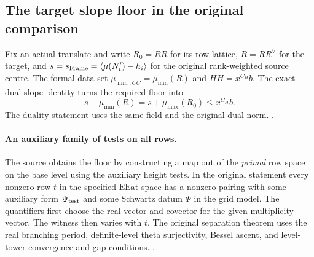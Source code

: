 \subsection{The target slope floor in the original comparison}
\label{geom:actual-target-floor}

Fix an actual translate and write \(R_0=RR\) for its row lattice,
\(R=RR^\vee\) for the target, and
\(s=s_{\rm Frame}=\langle\mu(N'_i)-h_i\rangle\) for the original
rank-weighted source centre. The formal data set
\(\mu_{\min,CC}=\mu_{\min}(R)\) and \(HH=x^{C_H}b\).
The exact dual-slope identity turns the required floor into
\[
 s-\mu_{\min}(R)=s+\mu_{\max}(R_0)\le x^{C_H}b.
\]
The duality statement uses the same field and the original dual norm.
.

\paragraph{An auxiliary family of tests on all rows.}
The source obtains the floor by constructing a map out of the
\emph{primal} row space on the base level using the auxiliary height tests. In the original
 statement every nonzero row \(t\) in the specified
\(\mathrm{EEat}\) space has a nonzero pairing with some auxiliary form
\(\Psi_{\rm test}\) and some Schwartz datum \(\Phi\) in the grid model.
The quantifiers first choose the real vector and covector for the
given multiplicity vector. The witness then varies with \(t\).
The original separation theorem uses the real branching period,
definite-level theta surjectivity, Bessel ascent, and level-tower
convergence and gap conditions.
.

